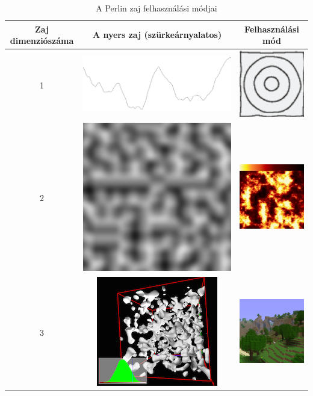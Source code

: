 \begin{table}[ht]
\centering
\caption{A Perlin zaj felhasználási módjai}
\label{tab:perlinnoise}
\begin{tabular}{|c|c|c|}
\hline
Zaj dimenziószáma & A nyers zaj (szürkeárnyalatos) & Felhasználási mód \\
\hline
1 & \includegraphics[width = 0.23\linewidth]{images/1dperlin.png} & \includegraphics[width = 0.23\linewidth]{images/1dperlinusecase.png} \\
\hline
2 & \includegraphics[width = 0.23\linewidth]{images/2dperlin.png} & \includegraphics[width = 0.23\linewidth]{images/2dperlinusecase.png} \\
\hline
3 & \includegraphics[width = 0.23\linewidth]{images/3dperlin.png} & \includegraphics[width = 0.23\linewidth]{images/3dperlinusecase.png} \\
\hline
\end{tabular}
\end{table}

